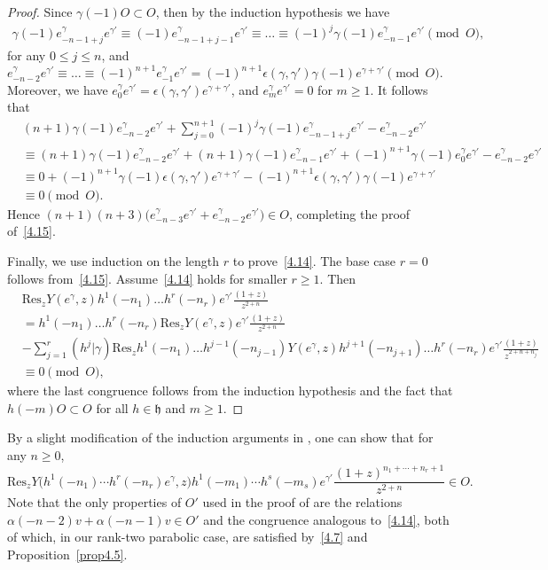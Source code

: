 \documentclass[12pt,a4paper,reqno]{amsart}
\numberwithin{equation}{section}
\numberwithin{equation}{section}
\theoremstyle{definition}
\def \al{\alpha}
\def \ga {\gamma}
\def \h {\mathfrak{h}}
\def\Res{\mathrm{Res}}
\def\ds{\dots}
\begin{document}
\begin{proof}
		Since $\ga(-1)O\subset O$, then by the induction hypothesis we have \begin{align*} \ga(-1)e^\ga_{-n-1+j}e^{\ga'}\equiv (-1)e^\ga_{-n-1+j-1}e^{\ga'}\equiv \ds\equiv (-1)^j \ga(-1)e^\ga_{-n-1}e^{\ga'}\pmod{O}, \end{align*} for any $0\leq j\leq n$, and $e^\ga_{-n-2}e^{\ga'}\equiv \ds \equiv (-1)^{n+1}e^\ga_{-1}e^{\ga'}=(-1)^{n+1}\epsilon(\ga,\ga')\ga(-1)e^{\ga+\ga'}\pmod{O}$. Moreover, we have $e^{\ga}_{0}e^{\ga'}=\epsilon(\ga,\ga')e^{\ga+\ga'}$, and $e^\ga_{m}e^{\ga'}=0$ for $m\geq 1$.
		It follows that \begin{align*} &(n+1)\ga(-1)e^\ga_{-n-2}e^{\ga'}+\sum_{j=0}^{n+1} (-1)^j\ga(-1) e^\ga_{-n-1+j}e^{\ga'}-e^\ga_{-n-2}e^{\ga'}\\ &\equiv (n+1) \ga(-1)e^{\ga}_{-n-2}e^{\ga'}+(n+1)\ga(-1)e^{\ga}_{-n-1}e^{\ga'}+ (-1)^{n+1} \ga(-1)e^{\ga}_{0}e^{\ga'}-e^\ga_{-n-2}e^{\ga'}\\ &\equiv 0+ (-1)^{n+1} \ga(-1)\epsilon(\ga,\ga')e^{\ga+\ga'}-(-1)^{n+1}\epsilon(\ga,\ga')\ga(-1)e^{\ga+\ga'}\\ &\equiv 0\pmod{O}. \end{align*}
		Hence $(n+1)(n+3)\big(e^\ga_{-n-3}e^{\ga'}+e^\ga_{-n-2}e^{\ga'}\big)\in O$, 
		completing the proof of~\eqref{4.15}.
		
		Finally, we use induction on the length $r$ to prove~\eqref{4.14}.  
		The base case $r=0$ follows from~\eqref{4.15}.  
		Assume~\eqref{4.14} holds for smaller $r\geq 1$. Then \begin{align*} &\Res_z Y(e^\ga,z)h^1(-n_1)\ds h^r(-n_r)e^{\ga'} \frac{(1+z)}{z^{2+n}}\\ &= h^1(-n_1)\ds h^r(-n_r) \Res_z Y(e^\ga,z)e^{\ga'} \frac{(1+z)}{z^{2+n}}\\ &-\sum_{j=1}^r (h^j|\ga) \Res_z h^1(-n_1)\ds h^{j-1}(-n_{j-1}) Y(e^\ga,z)h^{j+1}(-n_{j+1})\ds h^r(-n_r)e^{\ga'} \frac{(1+z)}{z^{2+n+n_j}}\\ &\equiv 0\pmod{O}, \end{align*}
		where the last congruence follows from the induction hypothesis and the fact that 
		$h(-m)O\subset O$ for all $h\in\h$ and $m\geq 1$.
	\end{proof}
	
	By a slight modification of the induction arguments in 
	\cite[Lemma~6.6 and Proposition~6.7]{Liu24}, one can show that for any $n\geq 0$,
	\begin{equation}\label{4.16}
		\Res_z Y\big(h^1(-n_1)\cdots h^r(-n_r)e^\ga,z\big)
		h^1(-m_1)\cdots h^s(-m_s)e^{\ga'}\frac{(1+z)^{n_1+\cdots+n_r+1}}{z^{2+n}}\in O.
	\end{equation}
	Note that the only properties of $O'$ used in the proof of 
	\cite[Lemma~6.6 and Proposition~6.7]{Liu24} are the relations 
	$\al(-n-2)v+\al(-n-1)v\in O'$ and the congruence analogous to~\eqref{4.14}, 
	both of which, in our rank-two parabolic case, are satisfied by~\eqref{4.7} 
	and Proposition~\ref{prop4.5}.
	
\end{document}
